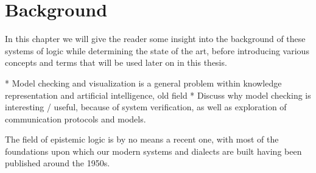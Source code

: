 \section{Background}\label{sec:back}

In this chapter we will give the reader some insight into the background of these systems of logic while determining the state of the art, before introducing various concepts and terms that will be used later on in this thesis.


* Model checking and visualization is a general problem within knowledge representation and artificial intelligence, old field
* Discuss why model checking is interesting / useful, because of system verification, as well as exploration of communication protocols and models.


%



The field of epistemic logic is by no means a recent one, with most of the foundations upon which our modern systems and dialects are built having been published around the 1950s.\cite{StanfordEpiLogic}



